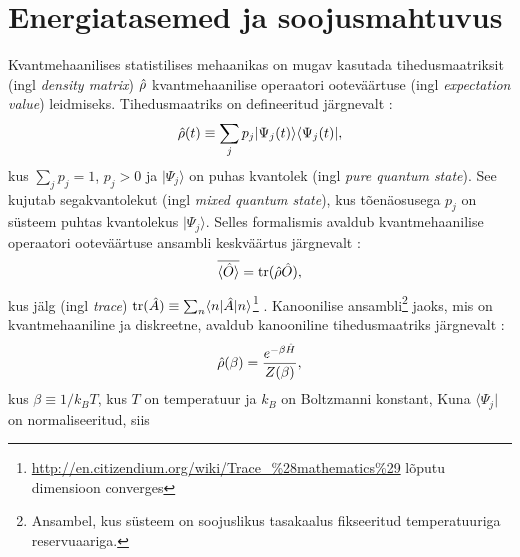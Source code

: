 \documentclass{trkut}%
\DeclareMathOperator{\tr}{tr}
\renewcommand\bra[1]{{\langle{#1}|}}
\renewcommand\ket[1]{{|{#1}\rangle}}
\renewcommand\braket[1]{\langle{#1}\rangle}
\begin{document}
%

\section{Energiatasemed ja soojusmahtuvus}
Kvantmehaanilises statistilises mehaanikas on mugav kasutada tihedusmaatriksit (ingl \textit{density matrix}) $\op{\rho}$ kvantmehaanilise operaatori ooteväärtuse (ingl \textit{expectation value}) leidmiseks.
Tihedusmaatriks on defineeritud järgnevalt \parencite[172]{kardar07}:
\begin{equation}
    \op{\rho}(t) \equiv \sum_j p_j \ket{\Psi_j(t)} \bra{\Psi_j(t)},
\end{equation}
kus $\sum_j p_j=1$, $p_j > 0$ ja $\ket{\Psi_j}$ on puhas kvantolek (ingl \textit{pure quantum state}).
See kujutab segakvantolekut (ingl \textit{mixed quantum state}), kus tõenäosusega $p_j$ on süsteem puhtas kvantolekus $\ket{\Psi_j}$.
Selles formalismis avaldub kvantmehaanilise operaatori ooteväärtuse ansambli keskväärtus järgnevalt \parencite[172]{kardar07}:
\begin{equation}
    \overline{\braket{\op{O}}}=\tr(\op{\rho}\op{O}),
    \label{ootev}
\end{equation}
kus jälg (ingl \textit{trace}) $\tr(\op{A}) \equiv \sum_n \braket{n|\op{A}|n}$\footnote{\url{http://en.citizendium.org/wiki/Trace_\%28mathematics\%29} lõputu dimensioon converges} \parencite{viide}.
Kanoonilise ansambli\footnote{Ansambel, kus süsteem on soojuslikus tasakaalus fikseeritud temperatuuriga reservuaariga.} jaoks, mis on kvantmehaaniline ja diskreetne, avaldub kanooniline tihedusmaatriks järgnevalt \parencite[174]{kardar07}:
\begin{equation}
    \op{\rho}(\beta) = \frac{e^{-\beta \op{H}}}{Z(\beta)},
    \label{tihm}
\end{equation}
kus $\beta \equiv 1/k_B T$, kus $T$ on temperatuur ja $k_B$ on Boltzmanni konstant,
Kuna $\bra{\Psi_j}$ on normaliseeritud, siis
\end{document}
